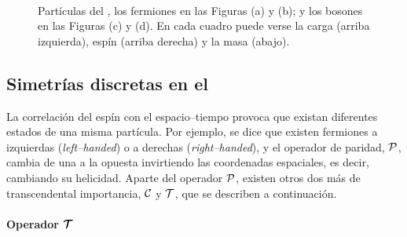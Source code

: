 \begin{figure}[H]
\centering
{} \phantom{olaola}
\\
%
\phantom{ola}
\caption{Partículas del \stdmod, los fermiones en las Figuras (a) y (b); y los bosones en las Figuras (c) y (d). En cada cuadro puede verse la carga (arriba izquierda), espín (arriba derecha) y la masa (abajo).} \label{stdmod_particles}
\end{figure}


\color{new}
\subsection{Simetrías discretas en el \stdmod} %

La correlación del espín con el espacio--tiempo provoca que existan diferentes estados de una misma partícula. Por ejemplo, se dice que existen fermiones a izquierdas (\emph{left--handed}) o a derechas (\emph{right--handed}), y el operador de paridad, $\mathcal{P}$, cambia de una a la opuesta invirtiendo las coordenadas espaciales, es decir, cambiando su helicidad. Aparte del operador $\mathcal{P}$, existen otros dos más de transcendental importancia, $\mathcal{C}$ y $\mathcal{T}$, que se describen a continuación. 



\paragraph{Operador $\bm{\mathcal{T}}$}

